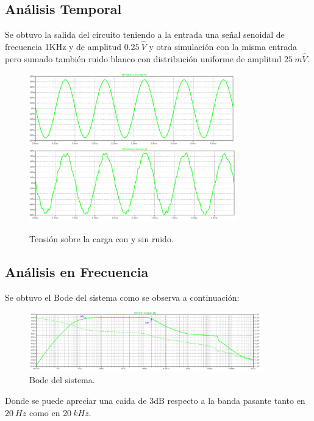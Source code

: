 \subsection{Análisis Temporal}
Se obtuvo la salida del circuito teniendo a la entrada una señal senoidal de frecuencia 1KHz y de amplitud $0.25 \ \hat{V}$ y otra simulación con la misma entrada pero sumado también ruido blanco con distribución uniforme de amplitud $25 \ m\hat{V}$.
\begin{figure}[H]
	\centering
	\includegraphics[width=0.8\textwidth]{ImagenesSimulaciones/VRL.png}
		\includegraphics[width=0.8\textwidth]{ImagenesSimulaciones/VRLNoise.png}
	\caption{Tensión sobre la carga con y sin ruido.}
	\label{fig:VRLN}
\end{figure}

\subsection{Análisis en Frecuencia}
Se obtuvo el Bode del sistema como se observa a continuación:
\begin{figure}[H]
	\centering
	\includegraphics[width=0.9\textwidth]{ImagenesSimulaciones/BODE.png}
	\caption{Bode del sistema.}
	\label{fig:bode}
\end{figure}

Donde se puede apreciar una caida de 3dB respecto a la banda pasante tanto en $20 \ Hz$ como en $20 \ kHz$.

